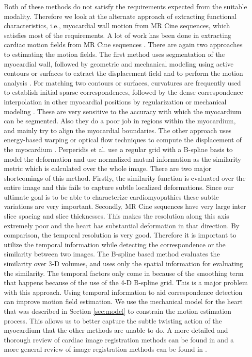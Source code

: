 Both of these methods do not satisfy the requirements expected from the suitable modality. Therefore we look at the alternate approach of extracting functional characteristics, i.e., myocardial wall motion from MR Cine sequences, which satisfies most of the requirements. A lot of work has been done in extracting cardiac motion fields from MR Cine sequences \cite{Shi99}\cite{Papa01}\cite{Wang01}\cite{McE00}\cite{Song91}\cite{ledesma01}\cite{perperidis04}. There are again two approaches to estimating the motion fields. The first method uses segmentation of the myocardial wall, followed by geometric and mechanical modeling using active contours or surfaces to extract the displacement field and to perform the motion analysis \cite {Shi99}\cite{Papa01}\cite{Wang01}. For matching two contours or surfaces, curvatures are frequently used to establish initial sparse correspondences, followed by the dense correspondence interpolation in other myocardial positions by regularization or mechanical modeling \cite {Shi99}\cite{McE00}. These are very sensitive to the accuracy with which the myocardium can be segmented. Also they do a poor job in regions within the myocardium, and mainly try to align the myocardial boundaries. The other approach uses energy-based warping or optical flow techniques to compute the displacement of the myocardium \cite {ledesma01}\cite{Song91}\cite{perperidis04}. Perperidis et al. \cite{perperidis04} use a regular grid with a B-spline basis to model the deformation and use normalized mutual information as the similarity metric which is calculated over the whole image. There are two major shortcomings of this method. Firstly, the similarity function is evaluated over the entire image and this fails to capture subtle localized deformations. Since our ultimate goal is to be able to characterize cardiomyopathies these subtle variations are very important. Secondly, MR Cine sequences have very large inter slice spacing and slice thicknesses. This makes the resolution along this axis extremely poor and the heart has substantial deformation in that direction. By comparison, the temporal resolution is very good. Therefore it is important to utilize the temporal information while detecting the correspondence or the similarity between two images. The B-spline based method evaluates the similarity over 3-D volumes, and uses only the spatial information for evaluating the similarity. The temporal factors only come in because of the smoothing term that happens because of the use of the 4-D B-spline grid. This is a major problem with this approach. Using temporal information to aid correspondence detection can improve motion field estimation. We use the mechanical model for the heart that was described in Section \ref{sec:model} to constrain the motion estimation process. This allows us to better capture the subtle twisting action of the myocardium that the other methods are unable to do.  A more detailed and thorough review of cardiac image registration methods can be found in \cite {makela02} and a more general review of image registration methods can be found in \cite{Zitova03}.

